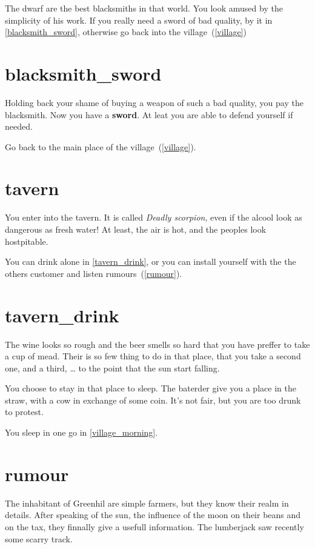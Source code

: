 The dwarf are the best blacksmiths in that world. You look amused by the
simplicity of his work. If you really need a sword of bad quality, by it in
\ref{blacksmith_sword}, otherwise go back into the village~(\ref{village})

\section{blacksmith_sword}

Holding back your shame of buying a weapon of such a bad quality, you pay the
blacksmith. Now you have a \textbf{sword}. At leat you are able to defend
yourself if needed.

Go back to the main place of the village~(\ref{village}).

\section{tavern}

You enter into the tavern. It is called \textit{Deadly scorpion}, even if the
alcool look as dangerous as fresh water! At least, the air is hot, and the
peoples look hostpitable.

You can drink alone in \ref{tavern_drink}, or you can install yourself with the
the others customer and listen rumours~(\ref{rumour}).

\section{tavern_drink}

The wine looks so rough and the beer smells so hard that you have preffer to
take a cup of mead. Their is so few thing to do in that place, that you take a
second one, and a third, … to the point that the sun start falling.

You choose to stay in that place to sleep. The baterder give you a place in the
straw, with a cow in exchange of some coin. It's not fair, but you are too drunk
to protest.

You sleep in one go in \ref{village_morning}.

\section{rumour}

The inhabitant of Greenhil are simple farmers, but they know their realm in
details. After speaking of the sun, the influence of the moon on their beans and
on the tax, they finnally give a usefull information. The lumberjack saw
recently some scarry track.

